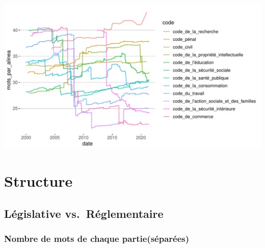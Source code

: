 \documentclass[
  oneside]{book}
\begin{document}
\includegraphics{05-images_files/figure-latex/mots_par_alinea-1.pdf}

\hypertarget{structure}{%
\section{Structure}\label{structure}}

\hypertarget{luxe9gislative-vs.-ruxe9glementaire}{%
\subsection{Législative vs.~Réglementaire}\label{luxe9gislative-vs.-ruxe9glementaire}}

\hypertarget{nombre-de-mots-de-chaque-partiesuxe9paruxe9es}{%
\subsubsection{Nombre de mots de chaque partie(séparées)}\label{nombre-de-mots-de-chaque-partiesuxe9paruxe9es}}
\end{document}
